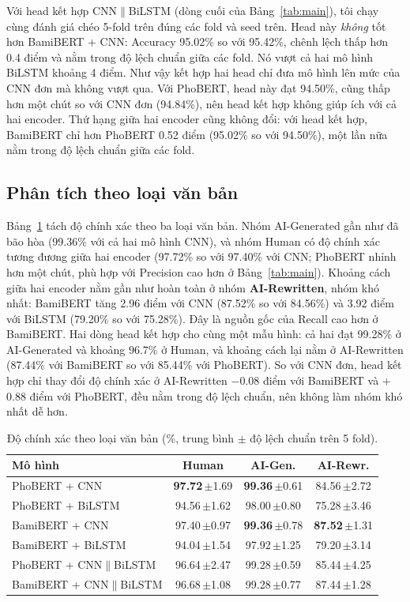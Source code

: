 \documentclass[conference,a4paper]{IEEEtran}
\newcommand{\pmv}[2]{#1\,{\scriptsize$\pm$#2}}
\begin{document}
Với head kết hợp CNN$\|$BiLSTM (dòng cuối của Bảng~\ref{tab:main}), tôi chạy cùng đánh giá chéo 5-fold trên đúng các fold và seed trên. Head này \emph{không} tốt hơn BamiBERT + CNN: Accuracy 95.02\% so với 95.42\%, chênh lệch thấp hơn 0.4 điểm và nằm trong độ lệch chuẩn giữa các fold. Nó vượt cả hai mô hình BiLSTM khoảng 4 điểm. Như vậy kết hợp hai head chỉ đưa mô hình lên mức của CNN đơn mà không vượt qua. Với PhoBERT, head này đạt 94.50\%, cũng thấp hơn một chút so với CNN đơn (94.84\%), nên head kết hợp không giúp ích với cả hai encoder. Thứ hạng giữa hai encoder cũng không đổi: với head kết hợp, BamiBERT chỉ hơn PhoBERT 0.52 điểm (95.02\% so với 94.50\%), một lần nữa nằm trong độ lệch chuẩn giữa các fold.

\subsection{Phân tích theo loại văn bản}
Bảng~\ref{tab:bytype} tách độ chính xác theo ba loại văn bản. Nhóm AI-Generated gần như đã bão hòa (99.36\% với cả hai mô hình CNN), và nhóm Human có độ chính xác tương đương giữa hai encoder (97.72\% so với 97.40\% với CNN; PhoBERT nhỉnh hơn một chút, phù hợp với Precision cao hơn ở Bảng~\ref{tab:main}). Khoảng cách giữa hai encoder nằm gần như hoàn toàn ở nhóm \textbf{AI-Rewritten}, nhóm khó nhất: BamiBERT tăng 2.96 điểm với CNN (87.52\% so với 84.56\%) và 3.92 điểm với BiLSTM (79.20\% so với 75.28\%). Đây là nguồn gốc của Recall cao hơn ở BamiBERT. Hai dòng head kết hợp cho cùng một mẫu hình: cả hai đạt 99.28\% ở AI-Generated và khoảng 96.7\% ở Human, và khoảng cách lại nằm ở AI-Rewritten (87.44\% với BamiBERT so với 85.44\% với PhoBERT). So với CNN đơn, head kết hợp chỉ thay đổi độ chính xác ở AI-Rewritten $-$0.08 điểm với BamiBERT và $+$0.88 điểm với PhoBERT, đều nằm trong độ lệch chuẩn, nên không làm nhóm khó nhất dễ hơn.

\begin{table}[t]
  \centering
  \caption{Độ chính xác theo loại văn bản (\%, trung bình $\pm$ độ lệch chuẩn trên 5 fold).}
  \label{tab:bytype}
  \setlength{\tabcolsep}{4pt}
  \begin{tabular}{lccc}
    \toprule
    Mô hình & Human & AI-Gen. & AI-Rewr. \\
    \midrule
    PhoBERT + CNN     & \pmv{\textbf{97.72}}{1.69} & \pmv{\textbf{99.36}}{0.61} & \pmv{84.56}{2.72} \\
    PhoBERT + BiLSTM  & \pmv{94.56}{1.62} & \pmv{98.00}{0.80} & \pmv{75.28}{3.46} \\
    BamiBERT + CNN    & \pmv{97.40}{0.97} & \pmv{\textbf{99.36}}{0.78} & \pmv{\textbf{87.52}}{1.31} \\
    BamiBERT + BiLSTM & \pmv{94.04}{1.54} & \pmv{97.92}{1.25} & \pmv{79.20}{3.14} \\
    \midrule
    {\scriptsize PhoBERT + CNN$\|$BiLSTM} & \pmv{96.64}{2.47} & \pmv{99.28}{0.59} & \pmv{85.44}{4.25} \\
    {\scriptsize BamiBERT + CNN$\|$BiLSTM} & \pmv{96.68}{1.08} & \pmv{99.28}{0.77} & \pmv{87.44}{1.28} \\
    \bottomrule
  \end{tabular}
\end{table}
\end{document}
